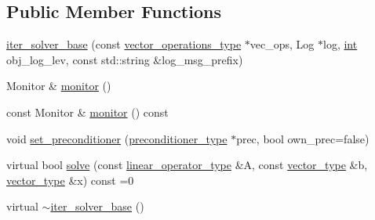 \subsection*{Public Member Functions}
\begin{DoxyCompactItemize}
\item 
\hyperlink{classnumerical__algos_1_1lin__solvers_1_1iter__solver__base_a6121eb6bb270322bdb94ad7b164a1d26}{iter\-\_\-solver\-\_\-base} (const \hyperlink{classnumerical__algos_1_1lin__solvers_1_1iter__solver__base_a1c0c7f5af3b439d5a53ce2433d6acb79}{vector\-\_\-operations\-\_\-type} $\ast$vec\-\_\-ops, Log $\ast$log, \hyperlink{classint}{int} obj\-\_\-log\-\_\-lev, const std\-::string \&log\-\_\-msg\-\_\-prefix)
\item 
Monitor \& \hyperlink{classnumerical__algos_1_1lin__solvers_1_1iter__solver__base_ac9787d0c84372ae0caf668a9e15ad09d}{monitor} ()
\item 
const Monitor \& \hyperlink{classnumerical__algos_1_1lin__solvers_1_1iter__solver__base_aae9e818b6539192e92dd772da5de2519}{monitor} () const 
\item 
void \hyperlink{classnumerical__algos_1_1lin__solvers_1_1iter__solver__base_ab08c622103b3fcd60e698867f2a2bc38}{set\-\_\-preconditioner} (\hyperlink{classnumerical__algos_1_1lin__solvers_1_1iter__solver__base_a0746ff1186cb6e8e5648b16065c9cdd2}{preconditioner\-\_\-type} $\ast$prec, bool own\-\_\-prec=false)
\item 
virtual bool \hyperlink{classnumerical__algos_1_1lin__solvers_1_1iter__solver__base_ac21be1f601f4937a97c0d3df3182a2af}{solve} (const \hyperlink{classnumerical__algos_1_1lin__solvers_1_1iter__solver__base_a547488978437ea7057c7fb113261407d}{linear\-\_\-operator\-\_\-type} \&A, const \hyperlink{classnumerical__algos_1_1lin__solvers_1_1iter__solver__base_a474414aa5d9e2b387f48a6bf182c47eb}{vector\-\_\-type} \&b, \hyperlink{classnumerical__algos_1_1lin__solvers_1_1iter__solver__base_a474414aa5d9e2b387f48a6bf182c47eb}{vector\-\_\-type} \&x) const =0
\item 
virtual \hyperlink{classnumerical__algos_1_1lin__solvers_1_1iter__solver__base_a0935ffc2a6d2cbafac016adb334437b1}{$\sim$iter\-\_\-solver\-\_\-base} ()
\end{DoxyCompactItemize}
